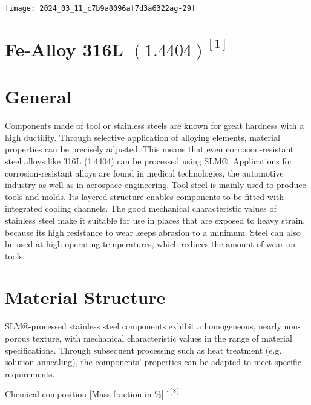 \documentclass[10pt]{article}
\begin{document}
\begin{center}
\texttt{[image: 2024\_03\_11\_c7b9a8096af7d3a6322ag-29]}
\end{center}

\section*{Fe-Alloy 316L $(1.4404)^{[1]}$}
\section*{General}
Components made of tool or stainless steels are known for great hardness with a high ductility. Through selective application of alloying elements, material properties can be precisely adjusted. This means that even corrosion-resistant steel alloys like 316L (1.4404) can be processed using SLM®. Applications for corrosion-resistant alloys are found in medical technologies, the automotive industry as well as in aerospace engineering. Tool steel is mainly used to produce tools and molds. Its layered structure enables components to be fitted with integrated cooling channels. The good mechanical characteristic values of stainless steel make it suitable for use in places that are exposed to heavy strain, because its high resistance to wear keeps abrasion to a minimum. Steel can also be used at high operating temperatures, which reduces the amount of wear on tools.

\section*{Material Structure}
SLM®-processed stainless steel components exhibit a homogeneous, nearly non-porous texture, with mechanical characteristic values in the range of material specifications. Through subsequent processing such as heat treatment (e.g. solution annealing), the components' properties can be adapted to meet specific requirements.

Chemical composition [Mass fraction in \%] $]^{[8]}$
\end{document}

